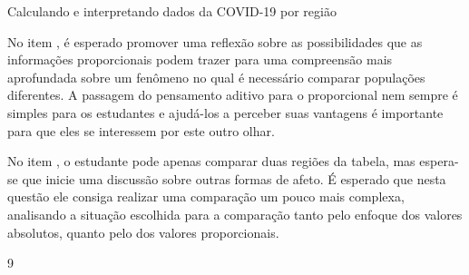 \begin{answer}{Calculando e interpretando dados da COVID-19 por região}
{  No item , é esperado promover uma reflexão sobre as possibilidades que as informações proporcionais podem trazer para uma compreensão mais aprofundada sobre um fenômeno no qual é necessário comparar populações diferentes. A passagem do pensamento aditivo para o proporcional nem sempre é simples para os estudantes e ajudá-los a perceber suas vantagens é importante para que eles se interessem por este outro olhar.

  No item , o estudante pode apenas comparar duas regiões da tabela, mas espera-se que inicie uma discussão sobre outras formas de afeto. É esperado que nesta questão ele consiga realizar uma comparação um pouco mais complexa, analisando a situação escolhida para a comparação tanto pelo enfoque dos valores absolutos, quanto pelo dos valores proporcionais.  

}{9}
\end{answer}

